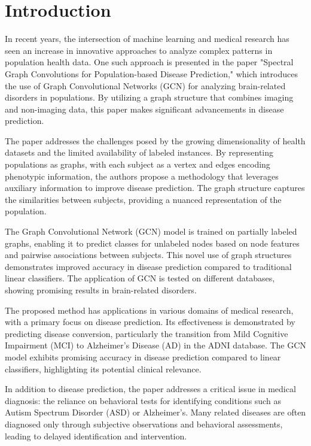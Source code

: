 
\section{Introduction}


\quad In recent years, the intersection of machine learning and medical research has seen an increase in innovative approaches to analyze complex patterns in population health data. One such approach is presented in the paper "Spectral Graph Convolutions for Population-based Disease Prediction," which introduces the use of Graph Convolutional Networks (GCN) for analyzing brain-related disorders in populations. By utilizing a graph structure that combines imaging and non-imaging data, this paper makes significant advancements in disease prediction.

The paper addresses the challenges posed by the growing dimensionality of health datasets and the limited availability of labeled instances. By representing populations as graphs, with each subject as a vertex and edges encoding phenotypic information, the authors propose a methodology that leverages auxiliary information to improve disease prediction. The graph structure captures the similarities between subjects, providing a nuanced representation of the population.

The Graph Convolutional Network (GCN) model is trained on partially labeled graphs, enabling it to predict classes for unlabeled nodes based on node features and pairwise associations between subjects. This novel use of graph structures demonstrates improved accuracy in disease prediction compared to traditional linear classifiers. The application of GCN is tested on different databases, showing promising results in brain-related disorders.

The proposed method has applications in various domains of medical research, with a primary focus on disease prediction. Its effectiveness is demonstrated by predicting disease conversion, particularly the transition from Mild Cognitive Impairment (MCI) to Alzheimer's Disease (AD) in the ADNI database. The GCN model exhibits promising accuracy in disease prediction compared to linear classifiers, highlighting its potential clinical relevance.

In addition to disease prediction, the paper addresses a critical issue in medical diagnosis: the reliance on behavioral tests for identifying conditions such as Autism Spectrum Disorder (ASD) or Alzheimer's. Many related diseases are often diagnosed only through subjective observations and behavioral assessments, leading to delayed identification and intervention.

